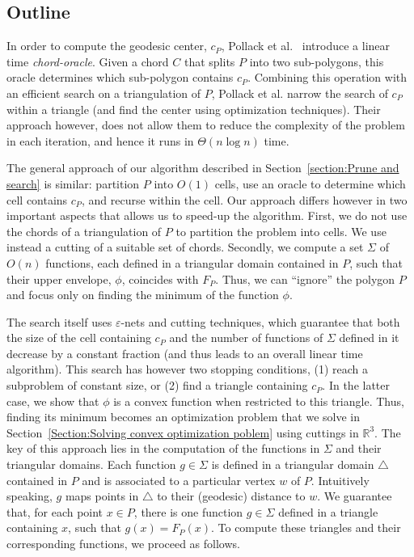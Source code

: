\documentclass[a4paper,UKenglish]{lipics}
\newcommand{\F}[2]{\ensuremath{F_{\scriptscriptstyle #1}(#2)}}
\newcommand{\cp}{\ensuremath{c_P}}
\begin{document}
\subsection{Outline}
In order to compute the geodesic center, $\cp$, Pollack et al.~\cite{pollackComputingCenter} introduce a linear time \emph{chord-oracle}. Given a chord $C$ that splits $P$ into two sub-polygons, this oracle determines which sub-polygon contains $\cp$. Combining this operation with an efficient search on a triangulation of $P$, Pollack et al. narrow the search of $\cp$ within a triangle (and find the center using optimization techniques). Their approach however, does not allow them to reduce the complexity of the problem in each iteration, and hence it runs in $\Theta(n\log n)$ time. 

The general approach of our algorithm described in Section~\ref{section:Prune and search} is similar: 
partition $P$ into $O(1)$ cells, use an oracle to determine which cell contains $\cp$, and recurse within the cell. 
Our approach differs however in two important aspects that allows us to speed-up the algorithm. 
First, we do not use the chords of a triangulation of $P$ to partition the problem into cells. 
We use instead a cutting of a suitable set of chords.
Secondly, we compute a set $\Sigma$ of $O(n)$ functions, each defined in a triangular domain contained in $P$, such that their upper envelope, $\phi$, coincides with $F_{\scriptscriptstyle P}$. 
Thus, we can ``ignore'' the polygon $P$ and focus only on finding the minimum of the function $\phi$. 

The search itself uses $\varepsilon$-nets and cutting techniques,
which guarantee that both the size of the cell containing $\cp$ and the number of functions of $\Sigma$ defined in it decrease by a constant fraction 
(and thus leads to an overall linear time algorithm).
This search has however two stopping conditions, (1) reach a subproblem of constant size, 
or (2) find a triangle containing $\cp$.
In the latter case, 
we show that $\phi$ is a convex function when restricted to this triangle. 
Thus, finding its minimum becomes an optimization problem that we solve in Section~\ref{Section:Solving convex optimization poblem} using cuttings in $\mathbb{R}^3$.
The key of this approach lies in the computation of the functions in $\Sigma$ and their triangular domains. 
Each function $g\in\Sigma$ is defined in  a triangular domain $\triangle$ contained in $P$ and is associated to a particular vertex $w$ of $P$. 
Intuitively speaking, $g$ maps points in $\triangle$ to their (geodesic) distance to $w$.
We guarantee that, for each point $x\in P$, there is one function $g\in \Sigma$ defined in a triangle containing $x$, such that $g(x) = \F{P}{x}$.
To compute these triangles and their corresponding functions, we proceed as follows.
\end{document}
